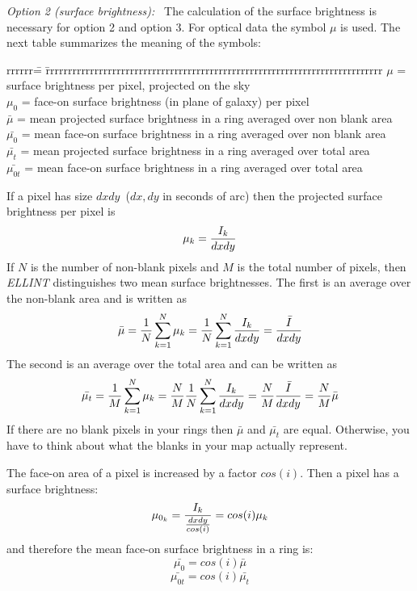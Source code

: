 \noindent
{\it Option 2 (surface brightness):\ } The calculation of the surface
brightness is necessary for option 2 and option 3. 
For optical data the symbol $\mu$ is used. The next table summarizes 
the meaning of the symbols:
\begin{tabbing}
rrrrrr\= =   \=rrrrrrrrrrrrrrrrrrrrrrrrrrrrrrrrrrrrrrrrrrrrrrrrrrrrrrrrrrrrrrrrrrrrrrrrrrrr\kill
$\mu$ \> = \> surface brightness per pixel, projected on the sky\\
$\mu_0$ \> = \> face-on surface brightness (in plane of galaxy) per pixel\\
$\bar{\mu}$ \> = \> mean projected surface brightness in a ring averaged over non blank area\\
$\bar{\mu_0}$ \> = \> mean face-on surface brightness in a ring averaged over non blank area\\
$\bar{\mu_{t}}$ \> = \> mean projected surface brightness in a ring averaged over total area\\
$\bar{\mu_{0t}}$ \> = \> mean face-on surface brightness in a ring averaged over total area\\
\end{tabbing}
If a pixel has size $dxdy$\ ($dx, dy$ in seconds of arc)
then the projected surface brightness per pixel is
\begin{equation}
\mu_k = {I_k \over{dxdy}}
\end{equation}
If $N$ is the number of non-blank pixels and $M$ is the total number of pixels, 
then {\it ELLINT} distinguishes two mean surface brightnesses. The first is an 
average over the non-blank area and is written as
\begin{equation} 
\bar{\mu} = {1\over{N}} \sum_{k=1}^{N}\mu_k = {1\over{N}} \sum_{k=1}^{N} {I_k \over{dxdy}} = {\bar{I} \over{dxdy} } 
\end{equation}
The second is an average over the total area and can be written as
\begin{equation}
\bar{\mu_{t}} = {1\over{M}} \sum_{k=1}^{N}\mu_k = {N\over{M}}{1\over{N}} \sum_{k=1}^{N} {I_k \over{dxdy}} 
= {N\over{M}} {\bar{I} \over{dxdy} } = {N\over{M}} \bar{\mu}
\end{equation}
If there are no blank pixels in your rings then $\bar{\mu}$ and $\bar{\mu_{t}}$
are equal. Otherwise, you have to think about what the blanks in your map
actually represent. 

\noindent
The face-on area of a pixel is increased by a factor $cos(i)$. Then a pixel 
has a surface brightness:
\begin{equation}
\mu_{0_k} = {I_k \over{{dxdy\over{cos(i)}}}} = cos(i) \mu_k
\end{equation}
and therefore the mean face-on surface brightness in a ring is:
\begin{equation}
\bar{\mu_0} = cos(i) \bar{\mu}
\end{equation}
\begin{equation}
\bar{\mu_{0t}} = cos(i) \bar{\mu_{t}}
\end{equation}




